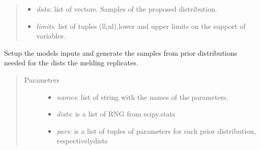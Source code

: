 \documentclass[a4paper,10pt,english]{sphinxmanual}
\begin{document}
\begin{fulllineitems}
\begin{fulllineitems}
\begin{quote}
\begin{description}
\begin{itemize}
\item {} 
\emph{data}: list of vectors. Samples of the proposed distribution.

\item {} 
\emph{limits}: list of tuples (ll,ul),lower and upper limits on the support of variables.

\end{itemize}

\end{description}\end{quote}

\end{fulllineitems}


\begin{fulllineitems}
\label{BIP.Bayes:BIP.Bayes.Melding.Meld.setTheta}
Setup the models inputs and generate the samples from prior distributions 
needed for the dists the melding replicates.
\begin{quote}\begin{description}
\item[{Parameters}] \leavevmode\begin{itemize}
\item {} 
\emph{names}: list of string with the names of the parameters.

\item {} 
\emph{dists}: is a list of RNG from scipy.stats

\item {} 
\emph{pars}: is a list of tuples of parameters for each prior distribution, respectivelydists

\end{itemize}

\end{description}\end{quote}

\end{fulllineitems}



\end{fulllineitems}
\end{document}
